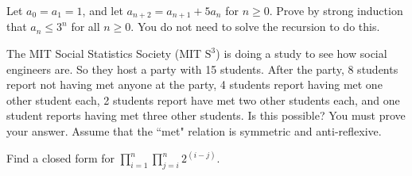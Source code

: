 \documentclass[12pt,twoside]{article}
\begin{document}
\newpage
\begin{problem}{10}
Let $a_0 = a_1 = 1$, and let $a_{n+2} = a_{n+1} + 5a_{n}$ for $n \geq 0$.  Prove by strong induction that $a_n \leq 3^n$ for all $n \geq 0$.  You do not need to solve the recursion to do this.
\end{problem}

\newpage
\begin{problem}{10}
The MIT Social Statistics Society (MIT $\text{S}^3$) is doing a study to see how social engineers are.  So they host a party with 15 students.  After the party, 8 students report not having met anyone at the party, 4 students report having met one other student each, 2 students report have met two other students each, and one student reports having met three other students.  Is this possible?  You must prove your answer. Assume that the ``met" relation is symmetric and anti-reflexive.

\end{problem}

\newpage
\begin{problem}{10}
Find a closed form for $\displaystyle\prod\limits_{i=1}^n \displaystyle\prod\limits_{j=i}^{n} 2^{(i-j)}$.
\end{problem}
\end{document}
